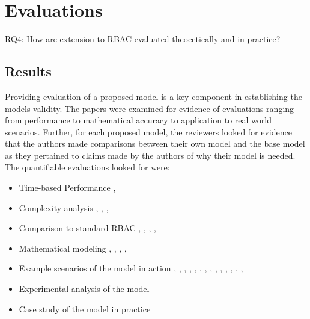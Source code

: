 \section{Evaluations} \label{sec:evaluations}

RQ4: How are extension to RBAC evaluated theoeetically and in practice?

\subsection{Results}

Providing evaluation of a proposed model is a key component in establishing the models validity.  The papers were examined
for evidence of evaluations ranging from performance to mathematical accuracy to application to real world scenarios.  Further,
for each proposed model, the reviewers looked for evidence that the authors made comparisons between their own model and the base
model as they pertained to claims made by the authors of why their model is needed.  The quantifiable evaluations looked for were:

\begin{itemize}
\setlength{\itemsep}{0.25pt}
\item Time-based Performance \cite{ni2010privacy}, \cite{aich09:role}
\item Complexity analysis \cite{bao08:role}, \cite{zhang06:collaborative}, \cite{chen08:spatio-temporal}, \cite{aich09:role}
\item Comparison to standard RBAC \cite{bao08:role}, \cite{zou2009crbac}, \cite{zhang06:collaborative}, \cite{zhao2008flexible}, \cite{ray07:spatio}
\item Mathematical modeling \cite{damian2007geo}, \cite{hansen2003spatial}, \cite{aich07:STARBAC}, \cite{chen08:spatio-temporal}, \cite{joshi05:generalized}
\item Example scenarios of the model in action \cite{alam06:constraint}, \cite{tzelepi01:flexible}, \cite{cholewka00:acontext-sensitive}, \cite{huang06:pervasive}, \cite{bao08:role}, \cite{jian2008extended}, \cite{yamazaki104:designing}, \cite{zou2009crbac}, \cite{ray07:spatio}, \cite{samuel07:spatio-temporal}, \cite{ray07:spatio}, \cite{joshi05:generalized}, \cite{yao2008task}, \cite{zhou2007team}, \cite{oh2003task}
\item Experimental analysis of the model
\item Case study of the model in practice \cite{motta03:contextual}
\end{itemize}

